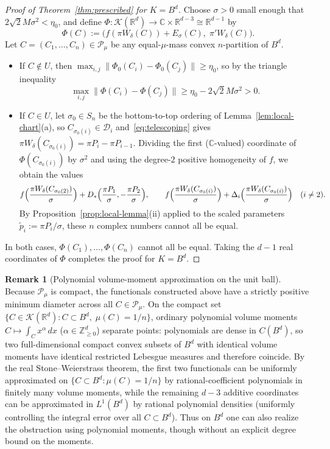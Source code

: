 \documentclass[11pt,a4paper]{amsart}
\numberwithin{equation}{section}
\theoremstyle{definition}
\newtheorem{remark}[theorem]{Remark}
\newcommand{\R}{\mathbb{R}}
\newcommand{\C}{\mathbb{C}}
\newcommand{\Z}{\mathbb{Z}}
\newcommand{\Kcal}{\mathcal{K}}
\newcommand{\Pcal}{\mathcal{P}}
\newcommand{\Dcal}{\mathcal{D}}
\begin{document}
\begin{proof}[Proof of Theorem~\ref{thm:prescribed} for $K = B^d$]
Choose $\sigma > 0$ small enough that $2 \sqrt{2} M \sigma^2 < \eta_0$, and define $\Phi : \Kcal(\R^d) \to \C \times \R^{d-3} \cong \R^{d-1}$ by
\[
\Phi(C) := \bigl(f(\pi W_\delta(C)) + E_\sigma(C),\; \pi' W_\delta(C)\bigr).
\]
Let $C = (C_1, \dots, C_n) \in \Pcal_\mu$ be any equal-$\mu$-mass convex $n$-partition of $B^d$.
\begin{itemize}
\item If $C \notin U$, then $\max_{i,j} \|\Phi_0(C_i) - \Phi_0(C_j)\| \ge \eta_0$, so by the triangle inequality
\[
\max_{i,j} \|\Phi(C_i) - \Phi(C_j)\| \ge \eta_0 - 2\sqrt{2} M \sigma^2 > 0.
\]
\item If $C \in U$, let $\sigma_0 \in S_n$ be the bottom-to-top ordering of Lemma~\ref{lem:local-chart}(a), so $C_{\sigma_0(i)} \in \Dcal_i$ and~\eqref{eq:telescoping} gives $\pi W_\delta(C_{\sigma_0(i)}) = \pi P_i - \pi P_{i-1}$. Dividing the first ($\C$-valued) coordinate of $\Phi(C_{\sigma_0(i)})$ by $\sigma^2$ and using the degree-$2$ positive homogeneity of $f$, we obtain the values
\[
f\Bigl(\frac{\pi W_\delta(C_{\sigma_0(2)})}{\sigma}\Bigr) + D_*\Bigl(\frac{\pi P_1}{\sigma}, -\frac{\pi P_2}{\sigma}\Bigr),
\qquad
f\Bigl(\frac{\pi W_\delta(C_{\sigma_0(i)})}{\sigma}\Bigr) + \Delta_i\Bigl(\frac{\pi W_\delta(C_{\sigma_0(i)})}{\sigma}\Bigr) \quad (i \ne 2).
\]
By Proposition~\ref{prop:local-lemma}(ii) applied to the scaled parameters $\tilde p_i := \pi P_i / \sigma$, these $n$ complex numbers cannot all be equal.
\end{itemize}
In both cases, $\Phi(C_1), \dots, \Phi(C_n)$ cannot all be equal. Taking the $d-1$ real coordinates of $\Phi$ completes the proof for $K = B^d$.
\end{proof}

\begin{remark}[Polynomial volume-moment approximation on the unit ball]
\label{rem:ball-polynomial}
Because $\Pcal_\mu$ is compact, the functionals constructed above have a strictly positive minimum diameter across all $C \in \Pcal_\mu$. On the compact set $\{C \in \Kcal(\R^d) : C \subset B^d,\; \mu(C) = 1/n\}$, ordinary polynomial volume moments $C \mapsto \int_C x^\alpha \, dx$ ($\alpha \in \Z_{\ge 0}^d$) separate points: polynomials are dense in $C(B^d)$, so two full-dimensional compact convex subsets of $B^d$ with identical volume moments have identical restricted Lebesgue measures and therefore coincide. By the real Stone--Weierstrass theorem, the first two functionals can be uniformly approximated on $\{C \subset B^d : \mu(C) = 1/n\}$ by rational-coefficient polynomials in finitely many volume moments, while the remaining $d-3$ additive coordinates can be approximated in $L^1(B^d)$ by rational polynomial densities (uniformly controlling the integral error over all $C \subset B^d$). Thus on $B^d$ one can also realize the obstruction using polynomial moments, though without an explicit degree bound on the moments.
\end{remark}
\end{document}
